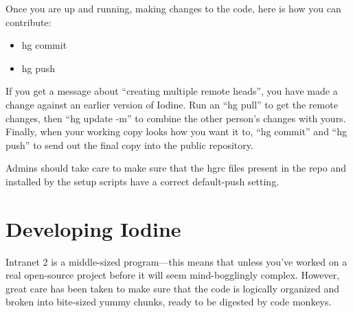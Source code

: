 \documentclass[11pt,letterpaper]{report}
\begin{document}
Once you are up and running, making changes to the code, here is how you
can contribute:
\begin{itemize}
	\item hg commit
	\item hg push
\end{itemize}

If you get a message about ``creating multiple remote heads'', you have made
a change against an earlier version of Iodine.  Run an ``hg pull'' to get
the remote changes, then ``hg update -m'' to combine the other person's
changes with yours.  Finally, when your working copy looks how you want it
to, ``hg commit'' and ``hg push'' to send out the final copy into the public
repository.

Admins should take care to make sure that the hgrc files present in the repo
and installed by the setup scripts have a correct default-push setting.
\section{Developing Iodine}
Intranet 2 is a middle-sized program---this means that unless you've worked on a
real open-source project before it will seem mind-bogglingly complex.  However,
great care has been taken to make sure that the code is logically organized
and broken into bite-sized yummy chunks, ready to be digested by code monkeys.
\end{document}
